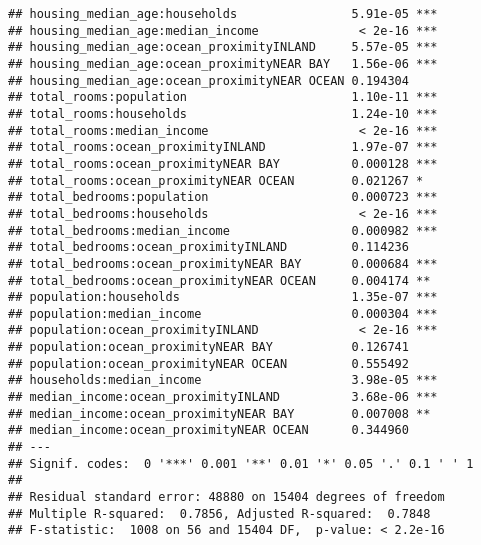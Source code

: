 \documentclass[
]{article}
\begin{document}
\begin{verbatim}
## housing_median_age:households                5.91e-05 ***
## housing_median_age:median_income              < 2e-16 ***
## housing_median_age:ocean_proximityINLAND     5.57e-05 ***
## housing_median_age:ocean_proximityNEAR BAY   1.56e-06 ***
## housing_median_age:ocean_proximityNEAR OCEAN 0.194304    
## total_rooms:population                       1.10e-11 ***
## total_rooms:households                       1.24e-10 ***
## total_rooms:median_income                     < 2e-16 ***
## total_rooms:ocean_proximityINLAND            1.97e-07 ***
## total_rooms:ocean_proximityNEAR BAY          0.000128 ***
## total_rooms:ocean_proximityNEAR OCEAN        0.021267 *  
## total_bedrooms:population                    0.000723 ***
## total_bedrooms:households                     < 2e-16 ***
## total_bedrooms:median_income                 0.000982 ***
## total_bedrooms:ocean_proximityINLAND         0.114236    
## total_bedrooms:ocean_proximityNEAR BAY       0.000684 ***
## total_bedrooms:ocean_proximityNEAR OCEAN     0.004174 ** 
## population:households                        1.35e-07 ***
## population:median_income                     0.000304 ***
## population:ocean_proximityINLAND              < 2e-16 ***
## population:ocean_proximityNEAR BAY           0.126741    
## population:ocean_proximityNEAR OCEAN         0.555492    
## households:median_income                     3.98e-05 ***
## median_income:ocean_proximityINLAND          3.68e-06 ***
## median_income:ocean_proximityNEAR BAY        0.007008 ** 
## median_income:ocean_proximityNEAR OCEAN      0.344960    
## ---
## Signif. codes:  0 '***' 0.001 '**' 0.01 '*' 0.05 '.' 0.1 ' ' 1
## 
## Residual standard error: 48880 on 15404 degrees of freedom
## Multiple R-squared:  0.7856, Adjusted R-squared:  0.7848 
## F-statistic:  1008 on 56 and 15404 DF,  p-value: < 2.2e-16
\end{verbatim}
\end{document}
